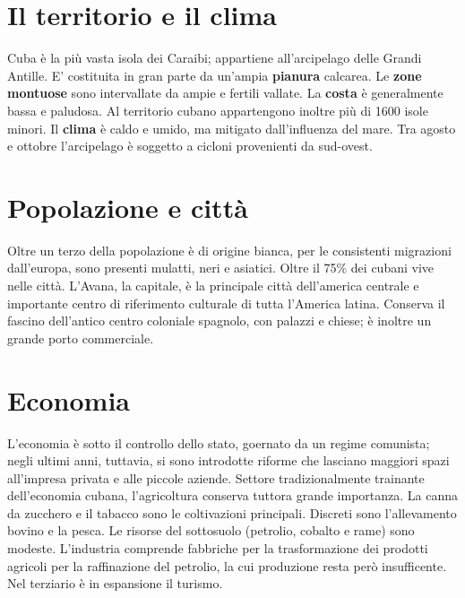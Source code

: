 \section{Il territorio e il clima}
Cuba è la più vasta isola dei Caraibi; appartiene all'arcipelago delle Grandi Antille. E' costituita in gran parte da un'ampia {\bf pianura} calcarea. Le {\bf zone montuose} sono intervallate da ampie e fertili vallate. La {\bf costa} è generalmente bassa e paludosa. Al territorio cubano appartengono inoltre più di 1600 isole minori.
Il {\bf clima} è caldo e umido, ma mitigato dall'influenza del mare. Tra agosto e ottobre l'arcipelago è soggetto a cicloni provenienti da sud-ovest.

\section{Popolazione e città}
Oltre un terzo della popolazione è di origine bianca, per le consistenti migrazioni dall'europa, sono presenti mulatti, neri e asiatici.
Oltre il 75\% dei cubani vive nelle città. L'Avana, la capitale, è la principale città dell'america centrale e importante centro di riferimento culturale di tutta l'America latina. Conserva il fascino dell'antico centro coloniale spagnolo, con palazzi e chiese; è inoltre un grande porto commerciale.

\section{Economia}
L'economia è sotto il controllo dello stato, goernato da un regime comunista; negli ultimi anni, tuttavia, si sono introdotte riforme che lasciano maggiori spazi all'impresa privata e alle piccole aziende.
Settore tradizionalmente trainante dell'economia cubana, l'agricoltura conserva tuttora grande importanza. La canna da zucchero e il tabacco sono le coltivazioni principali. Discreti sono l'allevamento bovino e la pesca.
Le risorse del sottosuolo (petrolio, cobalto e rame) sono modeste.
L'industria comprende fabbriche per la trasformazione dei prodotti agricoli per la raffinazione del petrolio, la cui produzione resta però insufficente.
Nel terziario è in espansione il turismo.

